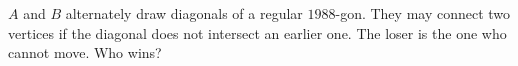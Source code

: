 $A$ and $B$ alternately draw diagonals of a regular $1988$-gon. They may connect two vertices if the diagonal does not intersect an earlier one. The loser is the one who cannot move. Who wins?
